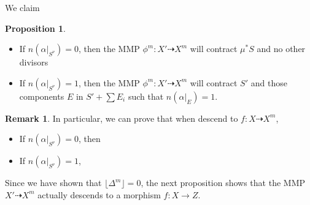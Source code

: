 \documentclass[11pt]{article}
\theoremstyle{definition}
\newtheorem{proposition}[theorem]{Proposition}
\newtheorem{remark}[theorem]{Remark}
\begin{document}
	We claim
	\begin{proposition}
		\begin{itemize}
			\item If $n(\alpha|_{S^\nu}) = 0$, then the MMP $\phi^m:X' \dashrightarrow X^m$ will contract $\mu^*S$ and no other divisors
			\item If $n(\alpha|_{S^\nu}) = 1$, then the MMP $\phi^m: X' \dashrightarrow X^m$ will contract $S'$ and those components $E$ in $S' + \sum E_i$ such that $n(\alpha|_{E}) =1$.
		\end{itemize}
	\end{proposition}
	
	\begin{remark}
		In particular, we can prove that when descend to $f: X \dashrightarrow X^m$,
		\begin{itemize}
			\item If $n(\alpha|_{S^\nu}) = 0$, then 
			\item If $n(\alpha|_{S^\nu}) = 1$, 
		\end{itemize}
	\end{remark}
	Since we have shown that $\lfloor{\Delta^m}\rfloor = 0$, the next proposition shows that the MMP $X' \dashrightarrow X^m$ actually descends to a morphism $f:X\to Z$. 
	
\end{document}
